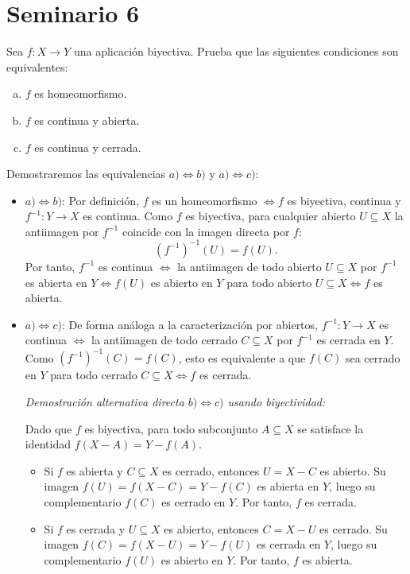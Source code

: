 \section{Seminario 6}
\begin{ejer}
    [93] Sea $f: X \longrightarrow Y$ una aplicación biyectiva. Prueba que las siguientes condiciones son equivalentes:
    \begin{enumerate}[a)]
        \item $f$ es homeomorfismo.
        \item $f$ es continua y abierta.
        \item $f$ es continua y cerrada.
    \end{enumerate}
\end{ejer}
\begin{sol}
    Demostraremos las equivalencias $a) \iff b)$ y $a) \iff c)$:

    \begin{itemize}
        \item $a) \iff b)$: Por definición, $f$ es un homeomorfismo $\iff f$ es biyectiva, continua y $f^{-1}: Y \longrightarrow X$ es continua. Como $f$ es biyectiva, para cualquier abierto $U \subseteq X$ la antiimagen por $f^{-1}$ coincide con la imagen directa por $f$:
        $$
            (f^{-1})^{-1}(U) = f(U).
        $$
        Por tanto, $f^{-1}$ es continua $\iff$ la antiimagen de todo abierto $U \subseteq X$ por $f^{-1}$ es abierta en $Y \iff f(U)$ es abierto en $Y$ para todo abierto $U \subseteq X \iff f$ es abierta.

        \item $a) \iff c)$: De forma análoga a la caracterización por abiertos, $f^{-1}: Y \longrightarrow X$ es continua $\iff$ la antiimagen de todo cerrado $C \subseteq X$ por $f^{-1}$ es cerrada en $Y$. Como $(f^{-1})^{-1}(C) = f(C)$, esto es equivalente a que $f(C)$ sea cerrado en $Y$ para todo cerrado $C \subseteq X \iff f$ es cerrada.

        \textit{Demostración alternativa directa $b) \iff c)$ usando biyectividad:}
        
        Dado que $f$ es biyectiva, para todo subconjunto $A \subseteq X$ se satisface la identidad $f(X - A) = Y - f(A)$.
        \begin{itemize}
            \item[$b) \Rightarrow c)$:] Si $f$ es abierta y $C \subseteq X$ es cerrado, entonces $U = X - C$ es abierto. Su imagen $f(U) = f(X - C) = Y - f(C)$ es abierta en $Y$, luego su complementario $f(C)$ es cerrado en $Y$. Por tanto, $f$ es cerrada.
            \item[$c) \Rightarrow b)$:] Si $f$ es cerrada y $U \subseteq X$ es abierto, entonces $C = X - U$ es cerrado. Su imagen $f(C) = f(X - U) = Y - f(U)$ es cerrada en $Y$, luego su complementario $f(U)$ es abierto en $Y$. Por tanto, $f$ es abierta.
        \end{itemize}
    \end{itemize}
\end{sol}

